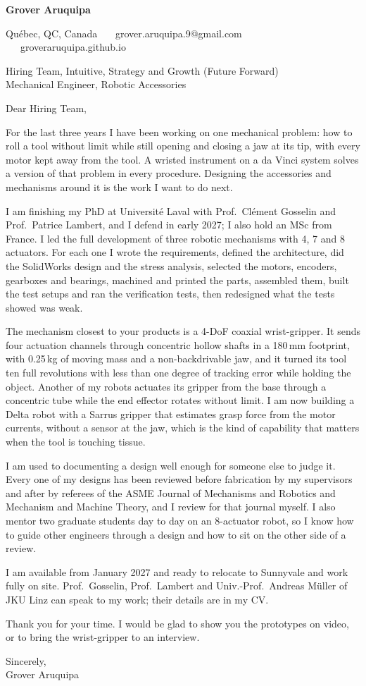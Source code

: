 \documentclass[11pt,letterpaper]{article}
\begin{document}
{\large\bfseries Grover Aruquipa}\par\vspace{-6pt}
{\small Qu\'ebec, QC, Canada \ \textbullet\ \ grover.aruquipa.9@gmail.com \ \textbullet\ \ groveraruquipa.github.io}

\vspace{4pt}
Hiring Team, Intuitive, Strategy and Growth (Future Forward)\\
Mechanical Engineer, Robotic Accessories

Dear Hiring Team,

For the last three years I have been working on one mechanical problem: how to roll a tool without limit while still opening and closing a jaw at its tip, with every motor kept away from the tool. A wristed instrument on a da Vinci system solves a version of that problem in every procedure. Designing the accessories and mechanisms around it is the work I want to do next.

I am finishing my PhD at Universit\'e Laval with Prof.\ Cl\'ement Gosselin and Prof.\ Patrice Lambert, and I defend in early 2027; I also hold an MSc from France. I led the full development of three robotic mechanisms with 4, 7 and 8 actuators. For each one I wrote the requirements, defined the architecture, did the SolidWorks design and the stress analysis, selected the motors, encoders, gearboxes and bearings, machined and printed the parts, assembled them, built the test setups and ran the verification tests, then redesigned what the tests showed was weak.

The mechanism closest to your products is a 4-DoF coaxial wrist-gripper. It sends four actuation channels through concentric hollow shafts in a 180\,mm footprint, with 0.25\,kg of moving mass and a non-backdrivable jaw, and it turned its tool ten full revolutions with less than one degree of tracking error while holding the object. Another of my robots actuates its gripper from the base through a concentric tube while the end effector rotates without limit. I am now building a Delta robot with a Sarrus gripper that estimates grasp force from the motor currents, without a sensor at the jaw, which is the kind of capability that matters when the tool is touching tissue.

I am used to documenting a design well enough for someone else to judge it. Every one of my designs has been reviewed before fabrication by my supervisors and after by referees of the ASME Journal of Mechanisms and Robotics and Mechanism and Machine Theory, and I review for that journal myself. I also mentor two graduate students day to day on an 8-actuator robot, so I know how to guide other engineers through a design and how to sit on the other side of a review.

I am available from January 2027 and ready to relocate to Sunnyvale and work fully on site. Prof.\ Gosselin, Prof.\ Lambert and Univ.-Prof.\ Andreas M\"uller of JKU Linz can speak to my work; their details are in my CV.

Thank you for your time. I would be glad to show you the prototypes on video, or to bring the wrist-gripper to an interview.

Sincerely,\\
Grover Aruquipa
\end{document}

